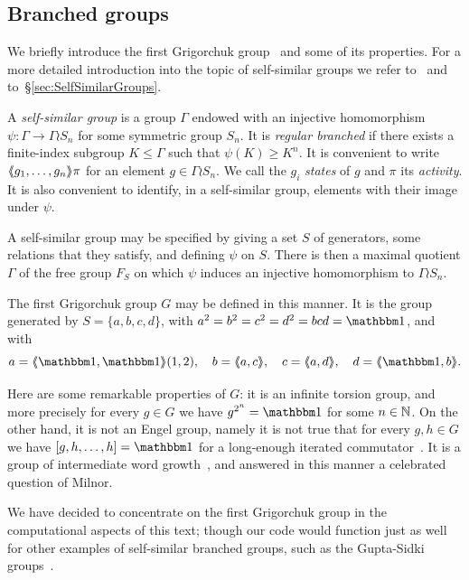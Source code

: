 \documentclass[a4paper,11pt]{amsart}
\begin{document}
\subsection{Branched groups}\label{ss:bg}
We briefly introduce the first Grigorchuk
group~\cite{Grigorchuk:Burnside} and some of its properties. For a more
detailed introduction into the topic of self-similar groups we refer
to~\cite{Nekrashevych:SelfSimilarGroups} and
to~\S\ref{sec:SelfSimilarGroups}.

A \emph{self-similar group} is a group $\Gamma$ endowed with an
injective homomorphism $\psi\colon\Gamma\to\Gamma\wr S_n$ for some
symmetric group $S_n$. It is \emph{regular branched} if there exists a
finite-index subgroup $K\le\Gamma$ such that $\psi(K)\ge K^n$. It is
convenient to write $\langle\negthickspace\langle g_1,\dots,g_n\rangle\negthickspace\rangle\pi$ for an element
$g\in\Gamma\wr S_n$. We call the $g_i$ \emph{states} of $g$ and $\pi$
its \emph{activity}. It is also convenient to identify, in a
self-similar group, elements with their image under $\psi$.

A self-similar group may be specified by giving a set $S$ of
generators, some relations that they satisfy, and defining $\psi$ on
$S$. There is then a maximal quotient $\Gamma$ of the free group $F_S$
on which $\psi$ induces an injective homomorphism to $\Gamma\wr S_n$.

The first Grigorchuk group $G$ may be defined in this manner. It is
the group generated by $S=\{a,b,c,d\}$, with $a^2=b^2=c^2=d^2=bcd=\id$,
and with
\[a=\pair{\id,\id}(1,2),\quad b=\pair{a,c},\quad c=\pair{a,d},\quad d=\pair{\id,b}. \]

Here are some remarkable properties of $G$: it is an infinite torsion
group, and more precisely for every $g\in G$ we have $g^{2^n}=\id$ for
some $n\in\mathbb{N}$. On the other hand, it is not an Engel group, namely it
is not true that for every $g,h\in G$ we have $[g,h,\dots,h]=\id$ for
a long-enough iterated commutator~\cite{Bartholdi:Engel}. It is a
group of intermediate word growth~\cite{Grigorchuk:Milnor}, and
answered in this manner a celebrated question of Milnor.

We have decided to concentrate on the first Grigorchuk group in the
computational aspects of this text; though our code would function
just as well for other examples of self-similar branched groups, such
as the Gupta-Sidki groups~\cite{Gupta-Sidki:PGroups}.

\end{document}
